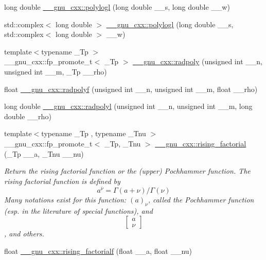 \begin{DoxyCompactItemize}
long double \hyperlink{group__mathsf__gnu_ga3aa007b4b4e345c30be015ab145d5598}{\+\_\+\+\_\+gnu\+\_\+cxx\+::polylogl} (long double \+\_\+\+\_\+s, long double \+\_\+\+\_\+w)
\item 
std\+::complex$<$ long double $>$ \hyperlink{group__mathsf__gnu_ga9eb79e506eda210610bc59c1912b4d0f}{\+\_\+\+\_\+gnu\+\_\+cxx\+::polylogl} (long double \+\_\+\+\_\+s, std\+::complex$<$ long double $>$ \+\_\+\+\_\+w)
\item 
{\footnotesize template$<$typename \+\_\+\+Tp $>$ }\\\+\_\+\+\_\+gnu\+\_\+cxx\+::fp\+\_\+promote\+\_\+t$<$ \+\_\+\+Tp $>$ \hyperlink{group__mathsf__gnu_ga195db2592888b7a8df870d9eaeff8d05}{\+\_\+\+\_\+gnu\+\_\+cxx\+::radpoly} (unsigned int \+\_\+\+\_\+n, unsigned int \+\_\+\+\_\+m, \+\_\+\+Tp \+\_\+\+\_\+rho)
\item 
float \hyperlink{group__mathsf__gnu_ga8a98d7c7c14f1aadff90123a114fa2c9}{\+\_\+\+\_\+gnu\+\_\+cxx\+::radpolyf} (unsigned int \+\_\+\+\_\+n, unsigned int \+\_\+\+\_\+m, float \+\_\+\+\_\+rho)
\item 
long double \hyperlink{group__mathsf__gnu_ga377febebd1096400897170bb7a76cd3a}{\+\_\+\+\_\+gnu\+\_\+cxx\+::radpolyl} (unsigned int \+\_\+\+\_\+n, unsigned int \+\_\+\+\_\+m, long double \+\_\+\+\_\+rho)
\item 
{\footnotesize template$<$typename \+\_\+\+Tp , typename \+\_\+\+Tnu $>$ }\\\+\_\+\+\_\+gnu\+\_\+cxx\+::fp\+\_\+promote\+\_\+t$<$ \+\_\+\+Tp, \+\_\+\+Tnu $>$ \hyperlink{group__mathsf__gnu_gae8c36a0e1f60254cf212a3806f7c675c}{\+\_\+\+\_\+gnu\+\_\+cxx\+::rising\+\_\+factorial} (\+\_\+\+Tp \+\_\+\+\_\+a, \+\_\+\+Tnu \+\_\+\+\_\+nu)
\begin{DoxyCompactList}\small\item\em Return the rising factorial function or the (upper) Pochhammer function. The rising factorial function is defined by \[ a^{\overline{\nu}} = \Gamma(a + \nu) / \Gamma(\nu) \] Many notations exist for this function\+: $ (a)_\nu $, called the Pochhammer function (esp. in the literature of special functions), and \[ \left[ \begin{array}{c} a \\ \nu \end{array} \right] \], and others. \end{DoxyCompactList}\item 
float \hyperlink{group__mathsf__gnu_ga10da05b995a42f0b0625e61186af7449}{\+\_\+\+\_\+gnu\+\_\+cxx\+::rising\+\_\+factorialf} (float \+\_\+\+\_\+a, float \+\_\+\+\_\+nu)

\end{DoxyCompactItemize}
